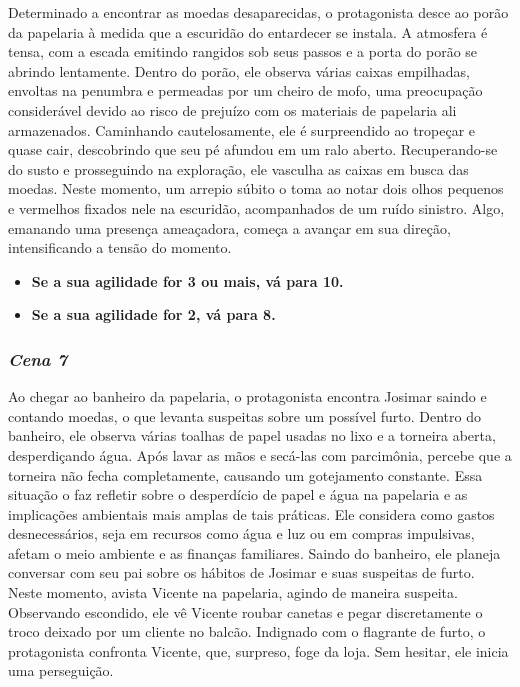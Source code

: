 Determinado a encontrar as moedas desaparecidas, o protagonista desce ao porão da papelaria à medida que a escuridão do entardecer se instala. A atmosfera é tensa, com a escada emitindo rangidos sob seus passos e a porta do porão se abrindo lentamente. Dentro do porão, ele observa várias caixas empilhadas, envoltas na penumbra e permeadas por um cheiro de mofo, uma preocupação considerável devido ao risco de prejuízo com os materiais de papelaria ali armazenados. Caminhando cautelosamente, ele é surpreendido ao tropeçar e quase cair, descobrindo que seu pé afundou em um ralo aberto. Recuperando-se do susto e prosseguindo na exploração, ele vasculha as caixas em busca das moedas. Neste momento, um arrepio súbito o toma ao notar dois olhos pequenos e vermelhos fixados nele na escuridão, acompanhados de um ruído sinistro. Algo, emanando uma presença ameaçadora, começa a avançar em sua direção, intensificando a tensão do momento.

\begin{itemize}
	\item \textbf{Se a sua agilidade for 3 ou mais, vá para 10.}
	\item \textbf{Se a sua agilidade for 2, vá para 8.}
\end{itemize}


\bigskip\medskip

\subsubsection*{\textit{\textbf{Cena 7}}}

Ao chegar ao banheiro da papelaria, o protagonista encontra Josimar saindo e contando moedas, o que levanta suspeitas sobre um possível furto. Dentro do banheiro, ele observa várias toalhas de papel usadas no lixo e a torneira aberta, desperdiçando água. Após lavar as mãos e secá-las com parcimônia, percebe que a torneira não fecha completamente, causando um gotejamento constante. Essa situação o faz refletir sobre o desperdício de papel e água na papelaria e as implicações ambientais mais amplas de tais práticas. Ele considera como gastos desnecessários, seja em recursos como água e luz ou em compras impulsivas, afetam o meio ambiente e as finanças familiares. Saindo do banheiro, ele planeja conversar com seu pai sobre os hábitos de Josimar e suas suspeitas de furto. Neste momento, avista Vicente na papelaria, agindo de maneira suspeita. Observando escondido, ele vê Vicente roubar canetas e pegar discretamente o troco deixado por um cliente no balcão. Indignado com o flagrante de furto, o protagonista confronta Vicente, que, surpreso, foge da loja. Sem hesitar, ele inicia uma perseguição.


